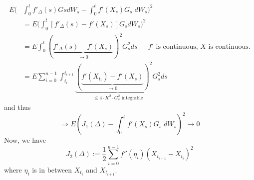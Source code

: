 \documentclass[english]{article}
\newcommand{\ub}{\underbrace}
\begin{document}
\begin{align*} 
E \Big( &\int^t_0 f'_\Delta(s) Gs dW_s - \int^t_0 f'(X_s) G_s \; dW_s \Big)^2 \\
&= E\Big( \int^t_0 [f'_\Delta (s) - f'(X_s)] G_s dW_s \Big)^2\\
&= E \int^t_0 (\ub{f'_\Delta(s) - f'(X_s)}_{\to 0})^2 G_s ^2 ds \;\;\;\text{ $f'$ is continuous, $X$ is continuous.} \\
& = E \sum^{n-1}_{i=0} \int^{t_{i+1}}_{t_i} \ub{(\ub{f'(X_{t_i}) - f'(X_s)}_{\to 0})^2 G^2_s}_{\leq 4\cdot K^2 \cdot G^2_s \text{ integrable}} ds 	
\end{align*}
and thus
$$\Rightarrow E(J_1(\Delta) - \int^t_0 f'(X_s) G_s \; dW_s)^2 \to 0$$
Now, we have 
$$J_2(\Delta) := \frac 12 \sum^{n-1}_{i=0} f''(\eta_i)(X_{t_{i+1}} - X_{t_{i}})^2$$
where $\eta_i$ is in between $X_{t_{i}}$ and $X_{t_{i+1}}$.  \newline
\end{document}
